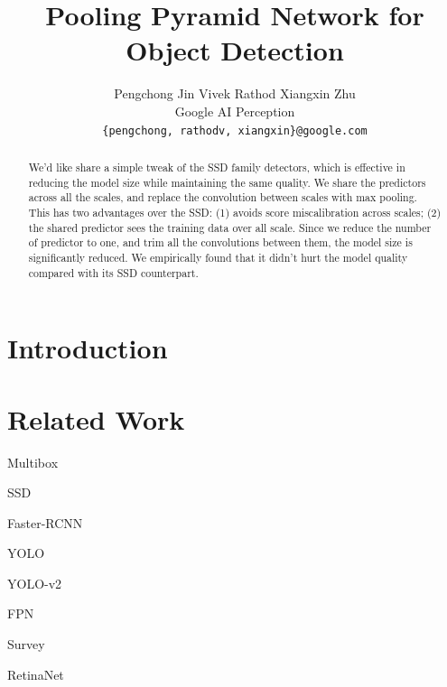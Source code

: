 \documentclass[10pt,twocolumn,letterpaper]{article}
\begin{document}
\title{Pooling Pyramid Network for Object Detection}

\author{
Pengchong Jin
\hspace*{32pt}
Vivek Rathod
\hspace*{32pt}
Xiangxin Zhu
\\
Google AI Perception\\
{\tt\small \{pengchong, rathodv, xiangxin\}@google.com}
}


\maketitle

\begin{abstract}
We'd like share a simple tweak of the SSD family detectors,
  which is effective in reducing the model size while
  maintaining the same quality. We share the predictors
  across all the scales, and replace the convolution between
  scales with max pooling. This has two advantages over the 
  SSD: (1) avoids score miscalibration across scales; (2)
  the shared predictor sees the training data over all
  scale. Since we reduce the number of predictor to one, and
  trim all the convolutions between them, the model size is
  significantly reduced. We empirically found that it didn't
  hurt the model quality compared with its SSD counterpart.

\end{abstract}

\section{Introduction}

\section{Related Work}

Multibox~\cite{erhan2014multibox}

SSD~\cite{liu2016ssd}

Faster-RCNN~\cite{ren2015frcnn}

YOLO~\cite{redmon2016yolo}

YOLO-v2~\cite{redmon2017yolov2}

FPN~\cite{lin2017fpn}

Survey~\cite{huang2017gmi}

RetinaNet~\cite{lin2017focal}
\end{document}
